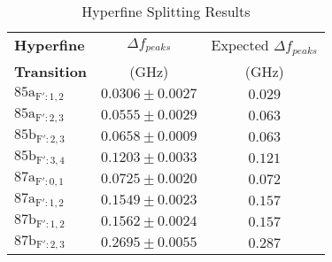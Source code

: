 \begin{table}[H]
\centering
\caption{Hyperfine Splitting Results} 
\label{tab:results}
\begin{tabular}{||l|c|c||}
 \hline
 \bf Hyperfine & $\Delta f_{peaks}$ & Expected $\Delta f_{peaks}$\\
    \bf Transition &  (GHz) & (GHz) \\
 \hline
 \bf $85\mathrm{a}_{\mathrm{F}': 1, 2}$ & $0.0306 \pm 0.0027$ & $0.029$ \\
 \bf $85\mathrm{a}_{\mathrm{F}': 2, 3}$ & $0.0555 \pm 0.0029$ & $0.063$ \\
 \bf $85\mathrm{b}_{\mathrm{F}': 2, 3}$ & $0.0658 \pm 0.0009$ & $0.063$ \\
 \bf $85\mathrm{b}_{\mathrm{F}': 3, 4}$ & $0.1203 \pm 0.0033$ & $0.121$ \\
 \bf $87\mathrm{a}_{\mathrm{F}': 0, 1}$ & $0.0725 \pm 0.0020$ & $0.072$ \\
 \bf $87\mathrm{a}_{\mathrm{F}': 1, 2}$ & $0.1549 \pm 0.0023$ & $0.157$ \\
 \bf $87\mathrm{b}_{\mathrm{F}': 1, 2}$ & $0.1562 \pm 0.0024$ & $0.157$ \\
 \bf $87\mathrm{b}_{\mathrm{F}': 2, 3}$ & $0.2695 \pm 0.0055$ & $0.287$ \\
 \hline
\end{tabular}
\end{table}


